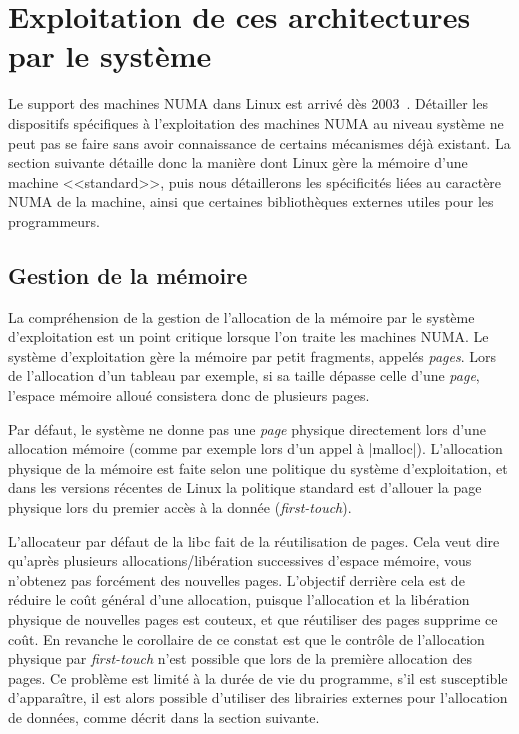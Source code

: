 \section{Exploitation de ces architectures par le système}\label{sec:context:os}

Le support des machines NUMA dans Linux est arrivé dès 2003~\cite{Dobson2003}.
Détailler les dispositifs spécifiques à l'exploitation des machines NUMA au niveau système ne peut pas se faire sans avoir connaissance de certains mécanismes déjà existant.
La section suivante détaille donc la manière dont Linux gère la mémoire d'une machine <<standard>>, puis nous détaillerons les spécificités liées au caractère NUMA de la machine, ainsi que certaines bibliothèques externes utiles pour les programmeurs.

\subsection{Gestion de la mémoire}

La compréhension de la gestion de l'allocation de la mémoire par le système d'exploitation est un point critique lorsque l'on traite les machines NUMA.
Le système d'exploitation gère la mémoire par petit fragments, appelés \emph{pages}.
Lors de l'allocation d'un tableau par exemple, si sa taille dépasse celle d'une \emph{page}, l'espace mémoire alloué consistera donc de plusieurs pages.

Par défaut, le système ne donne pas une \emph{page} physique directement lors d'une allocation mémoire (comme par exemple lors d'un appel à |malloc|).
L'allocation physique de la mémoire est faite selon une politique du système d'exploitation, et dans les versions récentes de Linux la politique standard est d'allouer la page physique lors du premier accès à la donnée (\emph{first-touch}).

L'allocateur par défaut de la libc fait de la réutilisation de pages. Cela veut dire qu'après plusieurs allocations/libération successives d'espace mémoire, vous n'obtenez pas forcément des nouvelles pages.
L'objectif derrière cela est de réduire le coût général d'une allocation, puisque l'allocation et la libération physique de nouvelles pages est couteux, et que réutiliser des pages supprime ce coût.
En revanche le corollaire de ce constat est que le contrôle de l'allocation physique par \emph{first-touch} n'est possible que lors de la première allocation des pages.
Ce problème est limité à la durée de vie du programme, s'il est susceptible d'apparaître, il est alors possible d'utiliser des librairies externes pour l'allocation de données, comme décrit dans la section suivante.

